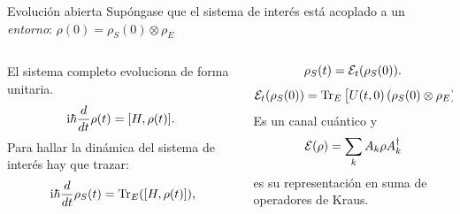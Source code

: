 \begin{frame}{Evolución abierta}
    Supóngase que el sistema de interés está acoplado a un \textit{entorno}: $\rho(0)=\rho_{S}(0)\otimes\rho_{E}$
    \vspace*{0.3cm}
    \begin{columns}
        \begin{column}{0.5\textwidth}
            El sistema completo evoluciona de forma unitaria.\begin{equation}
                \text{i}\hbar\frac{d}{d t} \rho(t)=[H,\rho(t)].\nonumber
            \end{equation}\pause
            Para hallar la dinámica del sistema de interés hay que trazar:
            \begin{align}
                \rmi\hbar\frac{d}{d t} \rho_{S}(t)=\Tr_{E}([H,\rho(t)])\rlap{,}\nonumber
            \end{align}
        \end{column}
        \pause
        \begin{column}{0.5\textwidth}
            \begin{equation}
                \rho_{S}(t)=\mathcal{E}_{t}(\rho_{S}(0)).\nonumber
            \end{equation}\pause
            \begin{equation}
                \mathcal{E}_{t}(\rho_{S}(0))=\Tr_{E}\qty[U(t,0)\left(\rho_{S}(0)\otimes\rho_{E}\right)U^{\dag}(t,0)],\nonumber
            \end{equation}\pause
            Es un canal cuántico y\pause
            \begin{equation}
                \mathcal{E}(\rho)=\sum_{k}A_{k}\rho A^{\dagger}_{k}\nonumber
            \end{equation}\pause
            es su representación en suma de operadores de Kraus.
        \end{column}
    \end{columns}
\end{frame}

